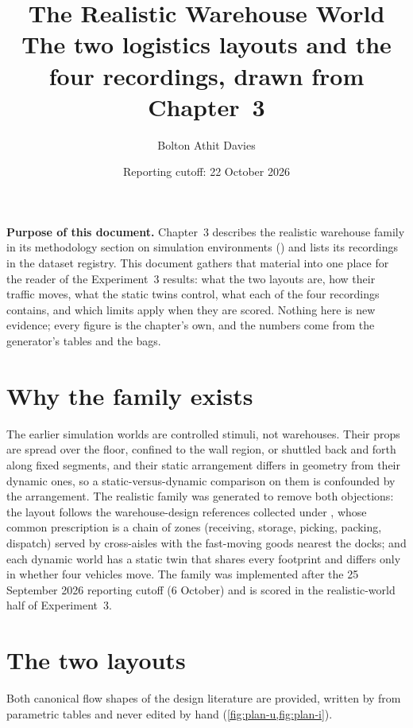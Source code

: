 \documentclass[11pt,a4paper,notitlepage]{report}
\title{The Realistic Warehouse World\\
       \large The two logistics layouts and the four \repo{dataset_allsensor_realistic} recordings,
       drawn from Chapter~3}
\author{Bolton Athit Davies}
\date{Reporting cutoff: 22 October 2026}
\begin{document}
\maketitle

\noindent\textbf{Purpose of this document.} Chapter~3 describes the realistic
warehouse family in its methodology section on simulation environments
() and lists its recordings in
the dataset registry. This document gathers that material into one place for
the reader of the Experiment~3 results: what the two layouts are, how their
traffic moves, what the static twins control, what each of the four
 recordings contains, and which limits
apply when they are scored. Nothing here is new evidence; every figure is the
chapter's own, and the numbers come from the generator's tables and the bags.

\section{Why the family exists}

The earlier simulation worlds are controlled stimuli, not warehouses. Their
props are spread over the floor, confined to the wall region, or shuttled back
and forth along fixed segments, and their static arrangement differs in
geometry from their dynamic ones, so a static-versus-dynamic comparison on them
is confounded by the arrangement. The realistic family was generated to remove
both objections: the layout follows the warehouse-design references collected
under , whose common prescription is a chain
of zones (receiving, storage, picking, packing, dispatch) served by cross-aisles
with the fast-moving goods nearest the docks; and each dynamic world has a
static twin that shares every footprint and differs only in whether four
vehicles move. The family was implemented after the 25 September 2026 reporting
cutoff (6 October) and is scored in the realistic-world half of Experiment~3.

\section{The two layouts}

Both canonical flow shapes of the design literature are provided, written by
 from parametric tables and never edited
by hand (\cref{fig:plan-u,fig:plan-i}).
\end{document}
